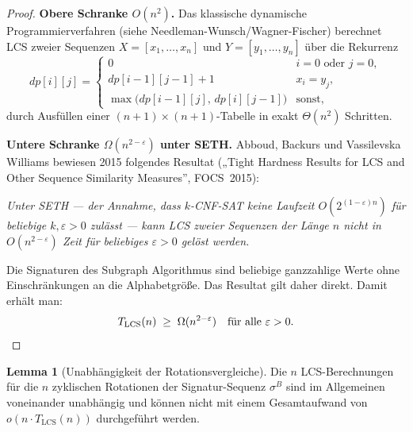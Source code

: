 \documentclass[a4paper,12pt]{article}
\theoremstyle{definition}
\newtheorem{lemma}{Lemma}
\begin{document}
\begin{proof}
\textbf{Obere Schranke $O(n^2)$.}
Das klassische dynamische Programmierverfahren (siehe Needleman-Wunsch/Wagner-Fischer) berechnet LCS zweier Sequenzen $X = [x_1, \ldots, x_n]$ und $Y = [y_1, \ldots, y_n]$ über die Rekurrenz
\[
	dp[i][j] = \begin{cases}
		0 & i = 0 \text{ oder } j = 0, \\
		dp[i-1][j-1] + 1 & x_i = y_j, \\
		\max\!\bigl(dp[i-1][j],\, dp[i][j-1]\bigr) & \text{sonst,}
	\end{cases}
\]
durch Ausfüllen einer $(n+1)\times(n+1)$-Tabelle in exakt $\Theta(n^2)$ Schritten.

\textbf{Untere Schranke $\Omega(n^{2-\varepsilon})$ unter SETH.}
Abboud, Backurs und Vassilevska Williams bewiesen 2015 folgendes Resultat
(„Tight Hardness Results for LCS and Other Sequence Similarity Measures'', FOCS~2015):

\medskip
\emph{Unter SETH — der Annahme, dass $k$-CNF-SAT keine Laufzeit $O(2^{(1-\varepsilon)n})$ für beliebige $k, \varepsilon > 0$ zulässt — kann LCS zweier Sequenzen der Länge $n$ nicht in $O(n^{2-\varepsilon})$ Zeit für beliebiges $\varepsilon > 0$ gelöst werden.}
\medskip

Die Signaturen des Subgraph Algorithmus sind beliebige ganzzahlige Werte ohne Einschränkungen an die Alphabetgröße.
Das Resultat gilt daher direkt. Damit erhält man:
\[
	T_{\mathrm{LCS}}(n) \;\geq\; \Omega(n^{2-\varepsilon}) \quad \text{für alle } \varepsilon > 0. \qedhere
\]
\end{proof}

\begin{lemma}[Unabhängigkeit der Rotationsvergleiche]
\label{lem:unabhaengigkeit}
Die $n$ LCS-Berechnungen für die $n$ zyklischen Rotationen der Signatur-Sequenz $\sigma^B$
sind im Allgemeinen voneinander unabhängig und können nicht mit einem Gesamtaufwand von $o(n \cdot T_{\mathrm{LCS}}(n))$ durchgeführt werden.
\end{lemma}
\end{document}
